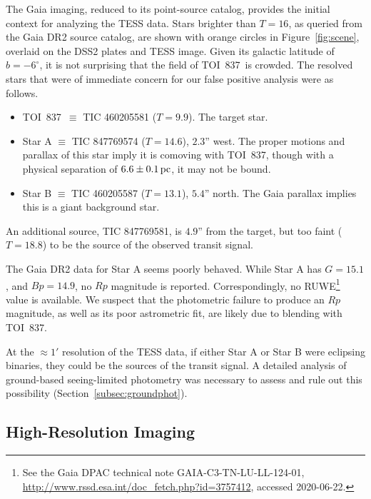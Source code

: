 \documentclass[12pt,twocolumn,tighten]{aastex63}
\newcommand{\tn}{TOI~837} %
\begin{document}
The Gaia imaging, reduced to its point-source catalog, provides
the initial context for analyzing the TESS data.  Stars brighter than
$T=16$, as queried from the Gaia DR2 source catalog, are shown with
orange circles in Figure~\ref{fig:scene}, overlaid on the DSS2 plates
and TESS image.  Given its galactic latitude of $b=-6^\circ$, it is
not surprising that the field of \tn\ is crowded.  The resolved stars
that were of immediate concern for our false positive analysis were as
follows.
\begin{itemize}
  \item \tn\ $\equiv$ TIC 460205581 ($T=9.9$). The target star.
  \item Star A $\equiv$ TIC 847769574 ($T=14.6$), $2.3$'' west. The
    proper motions and parallax of this star imply it is comoving with
    \tn, though with a physical separation of $6.6\pm 0.1\,{\rm pc}$,
    it may not be bound.
  \item Star B $\equiv$ TIC 460205587 ($T=13.1$), $5.4$'' north.  The
    Gaia parallax implies this is a giant background star.
\end{itemize}
An additional source, TIC 847769581, is $4.9$'' from the target, but
too faint ($T=18.8$) to be the source of the observed transit signal.

The Gaia DR2 data for Star A seems poorly behaved.  While Star A has
$G=15.1$, and $Bp=14.9$, no $Rp$ magnitude is reported.
Correspondingly, no RUWE\footnote{ See the Gaia DPAC technical note
GAIA-C3-TN-LU-LL-124-01,
\url{http://www.rssd.esa.int/doc_fetch.php?id=3757412}, accessed
2020-06-22. } value is available.
We suspect that the photometric failure to produce an $Rp$ magnitude,
as well as its poor astrometric fit, are likely due to blending with
\tn.

At the $\approx1'$ resolution of the TESS data, if either Star A
or Star B were eclipsing binaries, they could be the sources of the
transit signal.  A detailed analysis of ground-based seeing-limited
photometry was necessary to assess and rule out this possibility
(Section~\ref{subsec:groundphot}).


\subsection{High-Resolution Imaging}
\label{subsec:speckle}
\end{document}
